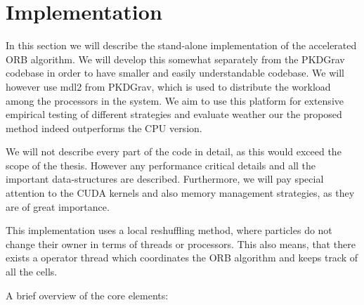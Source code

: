 \documentclass[]{article}
\begin{document}
\begin{comment}
\begin{figure}
\begin{center}
\begin{tikzpicture}
\begin{axis}[xmin = -1, xmax = 13, ymin=-1, ymax=6]
\addplot[domain = 0:12,blue] {ln(1024) / ln(2) * 
(\p * x / (900 * 6))
+  x / (50 * 6) + x /(170 * 2)};
\addplot[domain = 0:12,blue] {ln(1024 * 16) / ln(2) * 
(\p * x / (900 * 6))
+  x / (50 * 6) + x /(170 * 2)};
\end{axis}
\end{tikzpicture}
\end{center}
\caption{??}
\label{fig:exectimes}
\end{figure}

\end{comment}

\newpage
\section{Implementation}

In this section we will describe the stand-alone implementation of the accelerated ORB algorithm. We will develop this somewhat separately from the PKDGrav codebase in order to have smaller and easily understandable codebase. We will however use mdl2 from PKDGrav, which is used to distribute the workload among the processors in the system. We aim to use this platform for extensive empirical testing of different strategies and evaluate weather our the proposed method indeed outperforms the CPU version. 

We will not describe every part of the code in detail, as this would exceed the scope of the thesis. However any performance critical details and all the important data-structures are described. Furthermore, we will pay special attention to the CUDA kernels and also memory management strategies, as they are of great importance.

This implementation uses a local reshuffling method, where particles do not change their owner in terms of threads or processors. This also means, that there exists a operator thread which coordinates the ORB algorithm and keeps track of all the cells.

A brief overview of the core elements:
\end{document}
